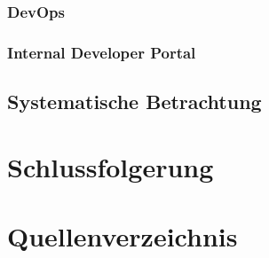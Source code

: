 \documentclass[a4paper,12pt]{article}
\begin{document}
    \subsubsection{DevOps}

    \subsubsection{Internal Developer Portal}

    \subsection{Systematische Betrachtung}


    \section{Schlussfolgerung}


    \section{Quellenverzeichnis}

    \printbibliography[heading=none]
\end{document}

